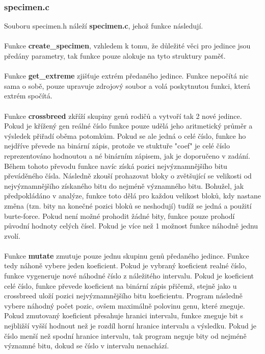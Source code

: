\documentclass[11pt, a4paper]{article}
\begin{document}
\subsubsection{specimen.c}
Souboru specimen.h náleží \textbf{specimen.c}, jehož funkce následují.\\\\Funkce \textbf{create\_specimen}, vzhledem k tomu, že důležité věci pro jedince jsou předány parametry, tak funkce pouze alokuje na tyto struktury paměť.\\\\Funkce \textbf{get\_extreme} zjišťuje extrém předaného jedince. Funkce nepočítá nic sama o sobě, pouze upravuje zdrojový soubor a volá poskytnutou funkci, která extrém spočítá.\\\\Funkce \textbf{crossbreed} zkříží skupiny genů rodičů a vytvoří tak 2 nové jedince. Pokud je křížený gen reálné číslo funkce pouze udělá jeho aritmetický průměr a výsledek přiřadí oběma potomkům. Pokud se ale jedná o celé číslo, funkce ho nejdříve převede na binární zápis, protože ve stuktuře "coef" je celé číslo reprezentováno hodnoutou a né binárním zápisem, jak je doporučeno v zadání. Během tohoto převodu funkce navíc získá pozici nejvýznamnějšího bitu převáděného čísla. Následně zkouší prohazovat bloky o zvětšující se velikosti od nejvýznamnějšího získaného bitu do nejméně významného bitu. Bohužel, jak předpokládáno v analýze, funkce toto dělá pro každou velikost bloků, kdy nastane změna (tzn. bity na konečné pozici bloků se neshodují) tudíž se jedná a použití burte-force. Pokud není možné prohodit žádné bity, funkce pouze prohodí původní hodnoty celých čísel. Pokud je více než 1 možnost funkce náhodně jednu zvolí.\\\\Funkce \textbf{mutate} zmutuje pouze jednu skupinu genů předaného jedince. Funkce tedy náhoně vybere jeden koeficient. Pokud je vybraný koeficient realné číslo, funkce vygeneruje nové náhodné číslo z náležitého intervalu. Pokud je koeficient celé číslo, funkce převede koeficient na binární zápis přičemž, stejně jako u crossbreed uloží pozici nejvýznamnějšího bitu koeficientu. Program následně vybere náhodný počet pozic, ovšem maximálně polovinu genu, které zneguje. Pokud zmutovaný koeficient přesahuje hranici intervalu, funkce zneguje bit s nejbližší vyšší hodnout než je rozdíl horní hranice intervalu a výsledku. Pokud je číslo menší než spodní hranice intervalu, tak program neguje bity od nejméně významné bitu, dokud se číslo v intervalu nenachází.\\\par
\end{document}
